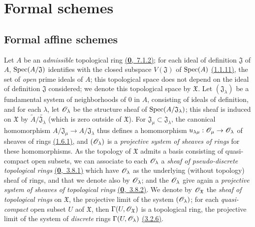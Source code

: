 \section{Formal schemes}
\label{section-formal-schemes}

\subsection{Formal affine schemes}
\label{subsection-formal-affine-schemes}

\begin{env}[10.1.1]
\label{env-1.10.1.1}
Let $A$ be an {\em admissible} topological ring \hyperref[defn-0.7.1.2]{(\textbf{0},~7.1.2)}; for each
ideal of definition $\mathfrak{J}$ of $A$, ${\mathop{\mathrm{Spec}}\nolimits}(A/\mathfrak{J})$ identifies
with the closed subspace $V(\mathfrak{J})$ of ${\mathop{\mathrm{Spec}}\nolimits}(A)$ \hyperref[prop-1.1.1.11]{(1.1.11)},
the set of {\em open} prime ideals of $A$; this topological space does not depend
on the ideal of definition $\mathfrak{J}$ considered; we denote this topological
space by $\mathfrak{X}$. Let $(\mathfrak{J}_\lambda)$ be a fundamental system
of neighborhoods of $0$ in $A$, consisting of ideals of definition, and for each
$\lambda$, let $\mathscr{O}_\lambda$ be the structure sheaf of
${\mathop{\mathrm{Spec}}\nolimits}(A/\mathfrak{J}_\lambda)$; this sheaf is induced on $\mathfrak{X}$ by
$\widetilde{A}/\widetilde{\mathfrak{J}_\lambda}$ (which is zero outside of
$\mathfrak{X}$). For $\mathfrak{J}_\mu\subset\mathfrak{J}_\lambda$, the
canonical homomorphism $A/\mathfrak{J}_\mu\to A/\mathfrak{J}_\lambda$ thus
defines a homomorphism $u_{\lambda\mu}:\mathscr{O}_\mu\to\mathscr{O}_\lambda$ of sheaves of
rings \hyperref[env-1.1.6.1]{(1.6.1)}, and $(\mathscr{O}_\lambda)$ is a {\em projective system of
sheaves of rings} for these homomorphisms. As the topology of $\mathfrak{X}$
admits a basis consisting of quasi-compact open subsets, we can associate to
each $\mathscr{O}_\lambda$ a {\em sheaf of pseudo-discrete topological rings}
\hyperref[env-0.3.8.1]{(\textbf{0},~3.8.1)} which have $\mathscr{O}_\lambda$ as the underlying (without topology)
sheaf of rings, and that we denote also by $\mathscr{O}_\lambda$; and the $\mathscr{O}_\lambda$ give again a
{\em projective system of sheaves of topological rings} \hyperref[env-0.3.8.2]{(\textbf{0},~3.8.2)}.
We denote by $\mathscr{O}_\mathfrak{X}$ the {\em sheaf of topological rings} on $\mathfrak{X}$, the
projective limit of the system $(\mathscr{O}_\lambda)$; for each {\em quasi-compact} open subset $U$
aof $\mathfrak{X}$, then $\Gamma(U,\mathscr{O}_\mathfrak{X})$ is a topological ring, the projective
limit of the system of {\em discrete} rings $\Gamma(U,\mathscr{O}_\lambda)$
\hyperref[env-0.3.2.6]{(3.2.6)}.
\end{env}

